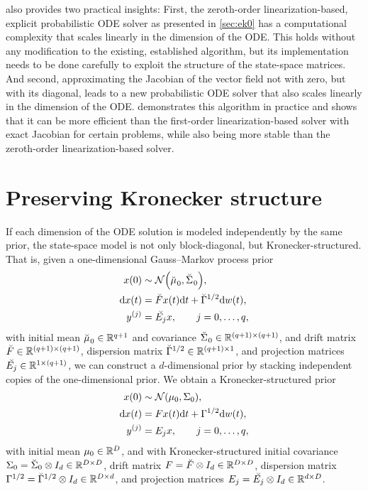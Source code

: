 \documentclass{mimosis}
\begin{document}
also provides two practical insights:
First, the zeroth-order linearization-based, explicit probabilistic ODE solver as presented in \cref{sec:ek0} has a computational complexity that scales linearly in the dimension of the ODE. This holds without any modification to the existing, established algorithm, but its implementation needs to be done carefully to exploit the structure of the state-space matrices.
And second, approximating the Jacobian of the vector field not with zero, but with its diagonal, leads to a new probabilistic ODE solver that also scales linearly in the dimension of the ODE.
\highdim{}
demonstrates this algorithm in practice and shows that it can be more efficient than the first-order linearization-based solver with exact Jacobian for certain problems, while also being more stable than the zeroth-order linearization-based solver.
\section{Preserving Kronecker structure}
\label{sec:org8f207b9}
\label{sec:highdim:kronecker}
If each dimension of the ODE solution is modeled independently by the same prior, the state-space model is not only block-diagonal, but Kronecker-structured.
That is, given a one-dimensional Gauss--Markov process prior
\begin{subequations}
\begin{align}
  \st(0) &\sim \N( \breve{\mean{}}_0, \breve{\cov{}}_0 ), \\
  \dd \st(t) &= \breve{\drift} \st(t) \dd t + \dispb \dd \wiener(t), \\
  \val^{(j)} &= \breve{\proj{j}} \st, \qquad j = 0, \dots, q,
\end{align}
\end{subequations}
with initial mean \(\breve{\mu_{}}_{0} \in \mathbb{R}^{q+1}\) and covariance \(\breve{\Sigma_{}}_{0} \in \mathbb{R}^{(q+1) \times (q+1)}\),
and drift matrix \(\breve{F} \in \mathbb{R}^{(q+1) \times (q+1)}\),
dispersion matrix \(\breve{\Gamma}^{1/2} \in \mathbb{R}^{(q+1) \times 1}\),
and projection matrices \(\breve{E_{j}} \in \mathbb{R}^{1 \times (q+1)}\),
we can construct a \(d\)-dimensional prior by stacking independent copies of the one-dimensional prior.
We obtain a Kronecker-structured prior
\begin{subequations}
\begin{align}
  \st(0) &\sim \N( \mean{0}, \cov{0} ), \\
  \dd \st(t) &= \drift \st(t) \dd t + \disp \dd \wiener(t), \\
  \val^{(j)} &= \proj{j} \st, \qquad j = 0, \dots, q,
\end{align}
\end{subequations}
with initial mean \(\mu_{0} \in \mathbb{R}^{D}\),
and with Kronecker-structured
initial covariance \(\Sigma_{0} = \breve{\Sigma}_{0} \otimes I_d \in \mathbb{R}^{D \times D}\),
drift matrix \(F = \breve{F} \otimes I_d \in \mathbb{R}^{D \times D}\),
dispersion matrix \(\Gamma^{1/2} = \breve{\Gamma}^{1/2} \otimes I_d \in \mathbb{R}^{D \times d}\),
and projection matrices \(E_{j} = \breve{E_{j}} \otimes I_d \in \mathbb{R}^{d \times D}\).
\end{document}

